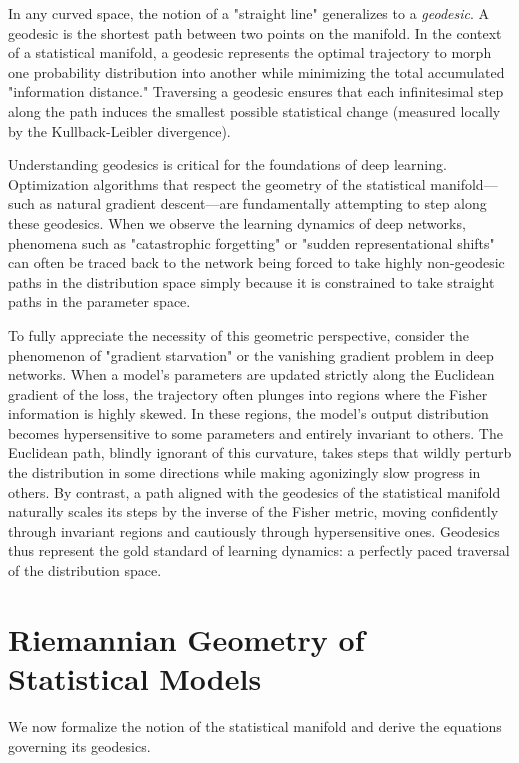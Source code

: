 In any curved space, the notion of a "straight line" generalizes to a \textit{geodesic}. A geodesic is the shortest path between two points on the manifold. In the context of a statistical manifold, a geodesic represents the optimal trajectory to morph one probability distribution into another while minimizing the total accumulated "information distance." Traversing a geodesic ensures that each infinitesimal step along the path induces the smallest possible statistical change (measured locally by the Kullback-Leibler divergence). 

Understanding geodesics is critical for the foundations of deep learning. Optimization algorithms that respect the geometry of the statistical manifold—such as natural gradient descent—are fundamentally attempting to step along these geodesics. When we observe the learning dynamics of deep networks, phenomena such as "catastrophic forgetting" or "sudden representational shifts" can often be traced back to the network being forced to take highly non-geodesic paths in the distribution space simply because it is constrained to take straight paths in the parameter space. 

To fully appreciate the necessity of this geometric perspective, consider the phenomenon of "gradient starvation" or the vanishing gradient problem in deep networks. When a model's parameters are updated strictly along the Euclidean gradient of the loss, the trajectory often plunges into regions where the Fisher information is highly skewed. In these regions, the model's output distribution becomes hypersensitive to some parameters and entirely invariant to others. The Euclidean path, blindly ignorant of this curvature, takes steps that wildly perturb the distribution in some directions while making agonizingly slow progress in others. By contrast, a path aligned with the geodesics of the statistical manifold naturally scales its steps by the inverse of the Fisher metric, moving confidently through invariant regions and cautiously through hypersensitive ones. Geodesics thus represent the gold standard of learning dynamics: a perfectly paced traversal of the distribution space.

\section{Riemannian Geometry of Statistical Models}

We now formalize the notion of the statistical manifold and derive the equations governing its geodesics.

